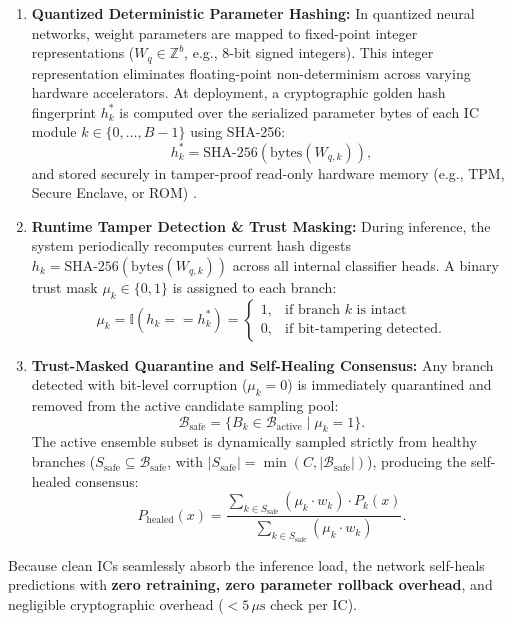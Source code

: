 \documentclass[conference,10pt]{IEEEtran}
\begin{document}
\begin{enumerate}
    \item \textbf{Quantized Deterministic Parameter Hashing:} In quantized neural networks, weight parameters are mapped to fixed-point integer representations ($W_q \in \mathbb{Z}^b$, e.g., 8-bit signed integers). This integer representation eliminates floating-point non-determinism across varying hardware accelerators. At deployment, a cryptographic golden hash fingerprint $h_k^*$ is computed over the serialized parameter bytes of each IC module $k \in \{0, \dots, B-1\}$ using SHA-256:
    \begin{equation}
        h_k^* = \text{SHA-256}\left(\text{bytes}(W_{q, k})\right),
    \end{equation}
    and stored securely in tamper-proof read-only hardware memory (e.g., TPM, Secure Enclave, or ROM) \cite{rangarajan2022supervault}.
    \item \textbf{Runtime Tamper Detection \& Trust Masking:} During inference, the system periodically recomputes current hash digests $h_k = \text{SHA-256}(\text{bytes}(W_{q, k}))$ across all internal classifier heads. A binary trust mask $\mu_k \in \{0, 1\}$ is assigned to each branch:
    \begin{equation}
        \mu_k = \mathbb{I}\left( h_k == h_k^* \right) = \begin{cases} 1, & \text{if branch } k \text{ is intact} \\ 0, & \text{if bit-tampering detected.} \end{cases}
    \end{equation}
    \item \textbf{Trust-Masked Quarantine and Self-Healing Consensus:} Any branch detected with bit-level corruption ($\mu_k = 0$) is immediately quarantined and removed from the active candidate sampling pool:
    \begin{equation}
        \mathcal{B}_{\text{safe}} = \{ B_k \in \mathcal{B}_{\text{active}} \mid \mu_k = 1 \}.
    \end{equation}
    The active ensemble subset is dynamically sampled strictly from healthy branches ($S_{\text{safe}} \subseteq \mathcal{B}_{\text{safe}}$, with $|S_{\text{safe}}| = \min(C, |\mathcal{B}_{\text{safe}}|)$), producing the self-healed consensus:
    \begin{equation}
        P_{\text{healed}}(x) = \frac{\sum_{k \in S_{\text{safe}}} (\mu_k \cdot w_k) \cdot P_k(x)}{\sum_{k \in S_{\text{safe}}} (\mu_k \cdot w_k)}.
    \end{equation}
\end{enumerate}
Because clean ICs seamlessly absorb the inference load, the network self-heals predictions with \textbf{zero retraining, zero parameter rollback overhead}, and negligible cryptographic overhead ($<5\,\mu\text{s}$ check per IC).
\end{document}
